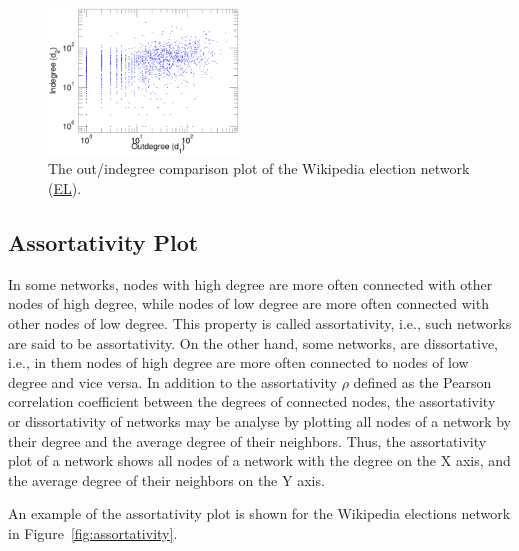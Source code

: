 \documentclass{article}
\newcommand{\wPlot}{0.45\textwidth}
\begin{document}
\begin{figure}
  \centering
  \includegraphics[width=\wPlot]{plot/outin.b.elec}
  \caption{
    \label{fig:outin}
    The out/indegree comparison plot of the Wikipedia election network 
    (\href{http://konect.cc/networks/elec/}{\textsf{EL}}).
  }
\end{figure}

\subsection{Assortativity Plot}
In some networks, nodes with high degree are more often connected with
other nodes of high degree, while nodes of low degree are more often
connected with other nodes of low degree.  This property is called
assortativity, i.e., such networks are said to be assortativity.  On the
other hand, some networks, are dissortative, i.e., in them nodes of high
degree are more often connected to nodes of low degree and vice versa.
In addition to the assortativity $\rho$ defined as the Pearson
correlation coefficient between the degrees of connected nodes, the
assortativity or dissortativity of networks may be analyse by plotting
all nodes of a network by their degree and the average degree of their
neighbors.  Thus, the assortativity plot of a network shows all nodes of
a network with the degree on the X axis, and the average degree of their
neighbors on the Y axis. 

An example of the assortativity plot is shown for the Wikipedia
elections network in Figure~\ref{fig:assortativity}. 
\end{document}
